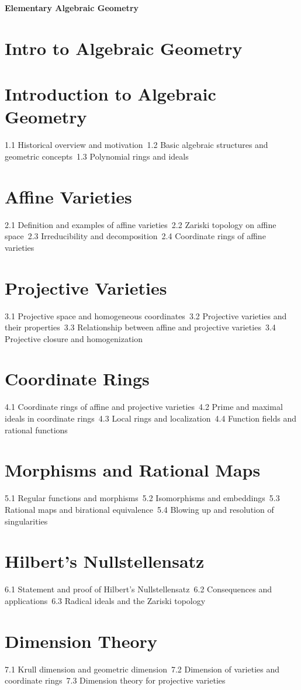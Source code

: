 {\LARGE \bf{Elementary Algebraic Geometry}}
\section{Intro to Algebraic Geometry}
\section{Introduction to Algebraic Geometry}
1.1 Historical overview and motivation\
1.2 Basic algebraic structures and geometric concepts\
1.3 Polynomial rings and ideals\
\section{Affine Varieties}
2.1 Definition and examples of affine varieties\
2.2 Zariski topology on affine space\
2.3 Irreducibility and decomposition\
2.4 Coordinate rings of affine varieties\
\section{Projective Varieties}
3.1 Projective space and homogeneous coordinates\
3.2 Projective varieties and their properties\
3.3 Relationship between affine and projective varieties\
3.4 Projective closure and homogenization\
\section{Coordinate Rings}
4.1 Coordinate rings of affine and projective varieties\
4.2 Prime and maximal ideals in coordinate rings\
4.3 Local rings and localization\
4.4 Function fields and rational functions\
\section{Morphisms and Rational Maps}
5.1 Regular functions and morphisms\
5.2 Isomorphisms and embeddings\
5.3 Rational maps and birational equivalence\
5.4 Blowing up and resolution of singularities\
\section{Hilbert's Nullstellensatz}
6.1 Statement and proof of Hilbert's Nullstellensatz\
6.2 Consequences and applications\
6.3 Radical ideals and the Zariski topology\
\section{Dimension Theory}
7.1 Krull dimension and geometric dimension\
7.2 Dimension of varieties and coordinate rings\
7.3 Dimension theory for projective varieties\
